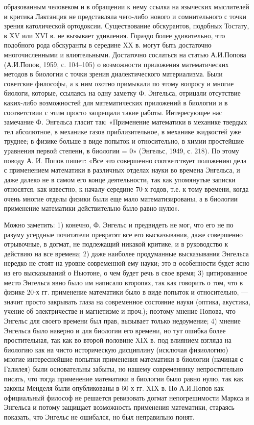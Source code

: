 образованным  человеком  и в  обращении  к  нему ссылка  на  языческих
мыслителей  и критика  Лактанция  не представляла  чего-либо нового  и
сомнительного  с точки  зрения католической  ортодоксии. Существование
обскурантов, подобных Тостату, в XV  или XVI в. не вызывает удивления.
Гораздо более удивительно, что подобного рода обскуранты в середине XX
в. могут  быть достаточно  многочисленными и  влиятельными. Достаточно
сослаться  на  статью  А.И.Попова  (А.И.Попов, 1959,  с.  104--105)  о
возможности  приложения  математических  методов в  биологии  с  точки
зрения  диалектического материализма.  Были  советские  философы, а  к
ним  охотно примыкали  по  этому вопросу  и  многие биологи,  которые,
ссылаясь на  одну заметку Ф. Энгельса,  отрицали отсутствие каких-либо
возможностей для математических приложений в биологии и в соответствии
с этим  просто запрещали такие  работы. Интересующее нас  замечание Ф.
Энгельса  гласит так:  «Применение математики  в механике  твердых тел
абсолютное, в механике газов приблизительное, в механике жидкостей уже
труднее;  в физике  больше  в  виде попыток  и  относительно, в  химии
простейшие уравнения первой  степени, в биологии =  0» (Энгельс, 1949,
с.  218). По  этому  поводу А.  И. Попов  пишет:  «Все это  совершенно
соответствует  положению дела  с  применением  математики в  различных
отделах науки во времена Энгельса, и  даже далеко не в самом его конце
деятельности, так  как упомянутые  записки относятся, как  известно, к
началу-середине 70-х  годов, т.е. к  тому времени, когда  очень многие
отделы физики были еще мало  математизированы, а в биологии применение
математики действительно было равно нулю».

Можно заметить: 1) конечно, Ф. Энгельс и предвидеть не мог, что его не
по  разуму усердные  почитатели превратят  все его  высказывания, даже
совершенно отрывочные,  в догмат, не  подлежащий никакой критике,  и в
руководство к  действию на все  времена; 2) даже  наиболее продуманные
высказывания  Энгельса  нередко не  стоят  на  уровне современной  ему
науки; это в  особенности будет ясно из его высказываний  о Ньютоне, о
чем будет речь в свое время;  3) цитированное место Энгельса явно было
им  написало второпях,  так  как говорить  о том,  что  в физике  20-х
гг.  применение математики  было в  виде попыток  и относительно,  ---
значит просто закрывать глаза  на современное состояние науки (оптика,
акустика,  учение  об электричестве  и  магнетизме  и проч.);  поэтому
мнение  Попова, что  Энгельс  для своего  времени  был прав,  вызывает
только недоумение; 4) мнение Энгельса  было наверно и для биологии его
времени,  но  тут  ошибка  более  простительная,  так  как  во  второй
половине  XIX  в.  под  влиянием  взгляда на  биологию  как  на  чисто
историческую  дисциплину  (исключая физиологию)  многие  интереснейшие
попытки  применения математики  в  биологии (начиная  с Галилея)  были
основательны забыты, но нашему современнику непростительно писать, что
тогда применение математики в биологии было равно нулю, так как законы
Менделя  были  опубликованы  в  60-х  гг.  XIX  в.  Но  А.И.Попов  как
официальный  философ  не  решается  ревизовать  догмат  непогрешимости
Маркса и Энгельса и потому защищает возможность применения математики,
стараясь показать, что Энгельс не ошибался, но был неправильно понят.

